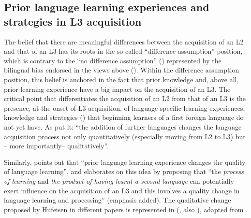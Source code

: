 \documentclass[output=paper,colorlinks,citecolor=brown,nonflat]{langsci/langscibook}
\begin{document}
\subsection{Prior language learning experiences and strategies in L3 acquisition}\label{sec:sanchez1:1.1}

The belief that there are meaningful differences between the acquisition of an L2 and that of an L3 has its roots in the so-called “difference assumption” position, which is contrary to the “no difference assumption” (\citealt{DeAngelis2007}) represented by the bilingual bias endorsed in the views above (\citealt{SharwoodSmith1994, MitchellMyles1998, Grosjean2010}). Within the difference assumption position, this belief is anchored in the fact that prior knowledge and, above all, prior learning experience have a big impact on the acquisition of an L3. The critical point that differentiates the acquisition of an L2 from that of an L3 is the presence, at the onset of L3 acquisition, of language-specific learning experiences, knowledge and strategies (\citealt{GibsonHufeisen2003}) that beginning learners of a first foreign language do not yet have. As \citet[145]{MarxHufeisen2004} put it: “the addition of further languages changes the language acquisition process not only quantitatively (especially moving from L2 to L3) but – more importantly– qualitatively”.

Similarly, \citet[207]{Jessner1999} points out that “prior language learning experience changes the quality of language learning”, and \citet[14]{Jessner2006} elaborates on this idea by proposing that “the \textit{process of learning} and \textit{the product of having learnt a second language} can potentially exert influence on the acquisition of an L3 and this involves a quality change in language learning and processing” (emphasis added). The qualitative change proposed by Hufeisen in different papers is represented in  (\citealt{Hufeisen1998}, also \citealt[145]{MarxHufeisen2004}), adapted from \citet[314]{HufeisenMarx2007}.


\end{document}
